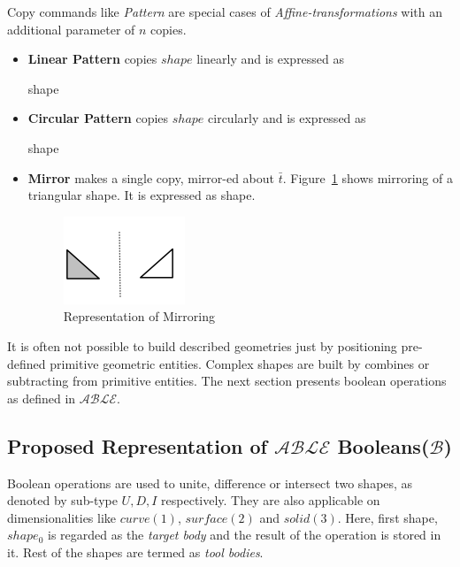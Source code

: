 Copy commands like {\em Pattern} are special cases of {\em Affine-transformations} with an additional parameter of $n$ copies.

\begin{itemize}[noitemsep,topsep=2pt,parsep=2pt,partopsep=2pt]
\item {\bf Linear Pattern} copies $shape$ linearly and is expressed as 

 {shape} 
\item {\bf Circular Pattern} copies $shape$ circularly and is expressed as 

 {shape} 
\item {\bf Mirror} makes a single copy, mirror-ed about $\bar{t}$. Figure~\ref{fig:abstraction:hodamirror} shows mirroring of a triangular shape. It is expressed as 
 {shape}. 

\begin{figure}[!h]
\centering 
\includegraphics[width=0.35\linewidth]{../Common/images/hodamirror} 
\caption{Representation of Mirroring}
\label{fig:abstraction:hodamirror}
\end{figure}

\end{itemize}

It is often not possible to build described geometries just by positioning pre-defined primitive geometric entities. Complex shapes are built by combines or subtracting from primitive entities. The next section presents boolean operations as defined in  $\mathcal{ABLE}$.

\subsection{Proposed Representation of $\mathcal{ABLE}$ Booleans($\mathcal{B}$)}


Boolean operations are used to unite, difference or intersect two shapes, as denoted by sub-type $U,D,I$ respectively. They are also applicable on dimensionalities like $curve(1)$, $surface(2)$ and $solid(3)$.  Here, first shape, $shape_0$ is regarded as the {\em target body} and the result of the operation is stored in it. Rest of the shapes are termed as {\em tool bodies}.

